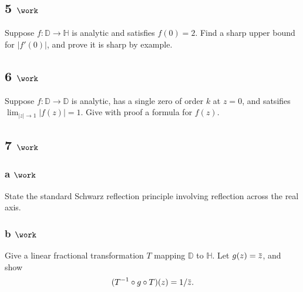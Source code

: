 \hypertarget{work-74}{%
\subsection{\texorpdfstring{5
\(\work\)}{5 \textbackslash work}}\label{work-74}}

Suppose \(f: {\mathbb{D}}\to {\mathbb{H}}\) is analytic and satisfies
\(f(0) = 2\). Find a sharp upper bound for
\({\left\lvert {f'(0)} \right\rvert}\), and prove it is sharp by
example.

\hypertarget{work-75}{%
\subsection{\texorpdfstring{6
\(\work\)}{6 \textbackslash work}}\label{work-75}}

Suppose \(f:{\mathbb{D}}\to{\mathbb{D}}\) is analytic, has a single zero
of order \(k\) at \(z=0\), and satsifies
\(\lim_{{\left\lvert {z} \right\rvert} \to 1} {\left\lvert {f(z)} \right\rvert} = 1\).
Give with proof a formula for \(f(z)\).

\hypertarget{work-76}{%
\subsection{\texorpdfstring{7
\(\work\)}{7 \textbackslash work}}\label{work-76}}

\hypertarget{a-work-6}{%
\subsubsection{\texorpdfstring{a
\(\work\)}{a \textbackslash work}}\label{a-work-6}}

State the standard Schwarz reflection principle involving reflection
across the real axis.

\hypertarget{b-work-8}{%
\subsubsection{\texorpdfstring{b
\(\work\)}{b \textbackslash work}}\label{b-work-8}}

Give a linear fractional transformation \(T\) mapping \({\mathbb{D}}\)
to \({\mathbb{H}}\). Let
\(g(z) = \mkern 1.5mu\overline{\mkern-1.5muz\mkern-1.5mu}\mkern 1.5mu\),
and show
\begin{align*}  
(T^{-1} \circ g \circ T)(z) = 1/\mkern 1.5mu\overline{\mkern-1.5muz\mkern-1.5mu}\mkern 1.5mu
.\end{align*}

